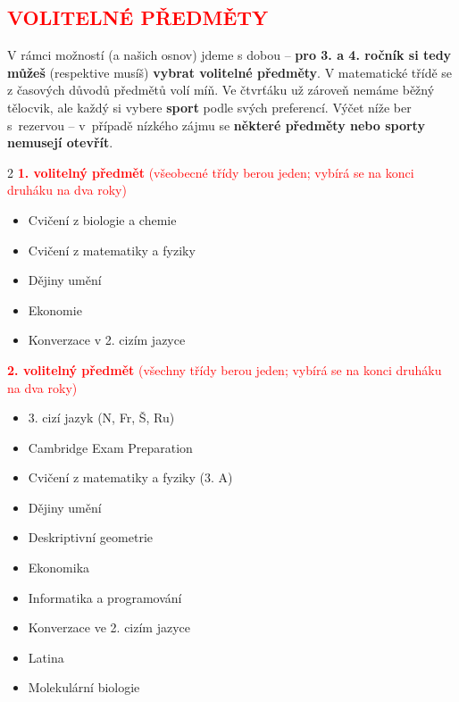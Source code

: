 \documentclass[a5paper, twoside]{article}
\newcommand{\podnadpis}[2]{
  \subsection*{\textcolor{#2}{#1}}
}
\begin{document}
\podnadpis{VOLITELNÉ PŘEDMĚTY}{red}

\noindent V rámci možností (a našich osnov) jdeme s dobou -- \textbf{pro 3. a 4. ročník si tedy můžeš}
(respektive musíš) \textbf{vybrat volitelné předměty}.
V matematické třídě se z časových důvodů předmětů volí míň. Ve čtvrťáku už zároveň nemáme běžný
tělocvik, ale každý si vybere \textbf{sport} podle svých preferencí. Výčet níže ber s~rezervou -- v~případě
nízkého zájmu se \textbf{některé předměty nebo sporty nemusejí otevřít}.

\begin{multicols}{2}
	\noindent \textcolor{red}{\textbf{1. volitelný předmět} (všeobecné třídy berou jeden; vybírá se na konci druháku na dva roky)}
	\begin{itemize}
		\item Cvičení z biologie a chemie
		\item Cvičení z matematiky a fyziky
		\item Dějiny umění
		\item Ekonomie
		\item Konverzace v 2. cizím jazyce
	\end{itemize}

  \noindent \textcolor{red}{\textbf{2. volitelný předmět} (všechny třídy berou jeden; vybírá se na konci druháku na dva roky)}
	\begin{itemize}
		\item 3. cizí jazyk (N, Fr, Š, Ru)
		\item Cambridge Exam Preparation
		\item Cvičení z matematiky a fyziky (3. A)
		\item Dějiny umění
		\item Deskriptivní geometrie
		\item Ekonomika
		\item Informatika a programování
		\item Konverzace ve 2. cizím jazyce
		\item Latina
		\item Molekulární biologie
	\end{itemize}


\end{multicols}
\end{document}
